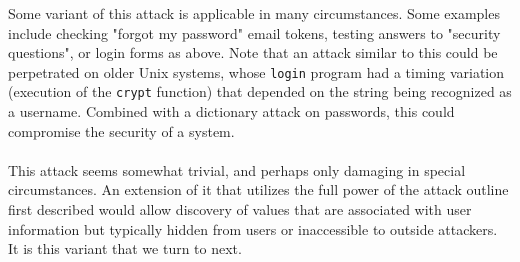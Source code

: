 \documentclass{article}
\providecommand{\inlinecode}{\texttt}
\begin{document}
Some variant of this attack is applicable in many circumstances. Some examples include checking "forgot my password" email tokens, testing answers to "security questions", or login forms as above. \cite{thisdata} Note that an attack similar to this could be perpetrated on older Unix systems, whose \inlinecode{login} program had a timing variation (execution of the \inlinecode{crypt} function) that depended on the string being recognized as a username. Combined with a dictionary attack on passwords, this could compromise the security of a system. \cite{wikitime} \\
  \\
This attack seems somewhat trivial, and perhaps only damaging in special circumstances. An extension of it that utilizes the full power of the attack outline first described would allow discovery of values that are associated with user information but typically hidden from users or inaccessible to outside attackers. It is this variant that we turn to next.
\end{document}
